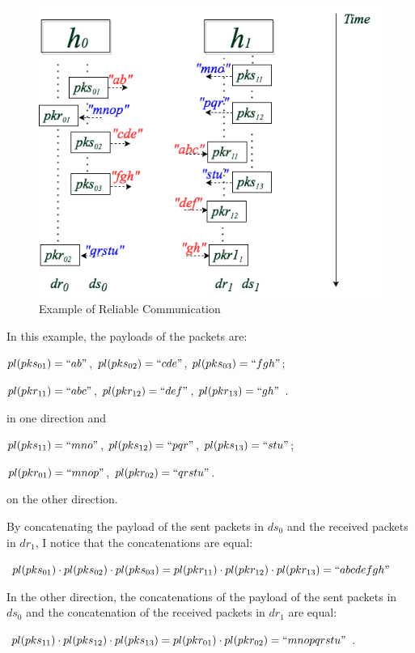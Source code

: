 \begin{figure}[H]
\centerline{\includegraphics[scale=0.5]{Figures/reliableexample}}
\caption{Example of Reliable Communication}
\label{reliableexample}
\end{figure}

In this example, the payloads of the packets are:

$pl(pks_{01})=``ab"$, $ pl(pks_{02})=``cde"$, $pl(pks_{03})=``fgh"$;

$pl(pkr_{11})=``abc"$, $pl(pkr_{12})=``def"$, $pl(pkr_{13})=``gh"$ .

in one direction and 

$pl(pks_{11})=``mno"$, $pl(pks_{12})=``pqr"$, $pl(pks_{13})=``stu"$;

$pl(pkr_{01})=``mnop"$, $pl(pkr_{02})=``qrstu"$. 

on the other direction. 

By concatenating the payload of the sent packets in $ds_0$ and the received packets in $dr_1$, I notice that the concatenations are equal: 

$pl(pks_{01}) \cdot pl(pks_{02}) \cdot pl(pks_{03}) = pl(pkr_{11}) \cdot pl(pkr_{12}) \cdot pl(pkr_{13}) = ``abcdefgh"$ 

In the other direction, the concatenations of the payload of the sent packets in $ds_0$ and the concatenation of the received packets in $dr_1$ are equal:

$pl(pks_{11}) \cdot pl(pks_{12}) \cdot pl(pks_{13}) = pl(pkr_{01}) \cdot pl(pkr_{02}) = ``mnopqrstu"$. 

